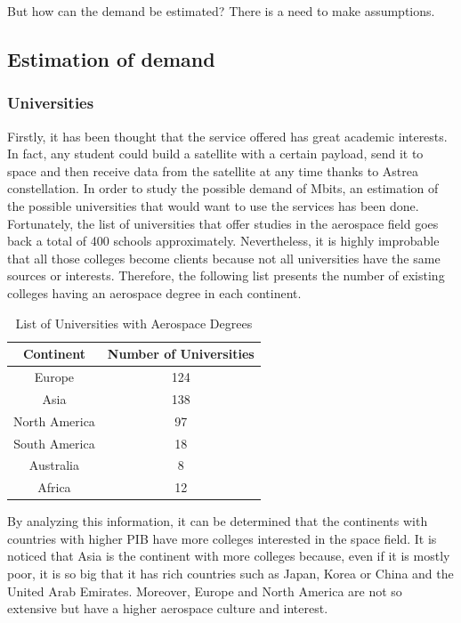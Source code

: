 But how can the demand be estimated? There is a need to make assumptions. 

\subsection{Estimation of demand}

\subsubsection{Universities}

Firstly, it has been thought that the service offered has great academic interests. In fact, any student could build a satellite with a certain payload, send it to space and then receive data from the satellite at any time thanks to Astrea constellation. 
\newline
\newline
In order to study the possible demand of Mbits, an estimation of the possible universities that would want to use the services has been done. Fortunately, the list of universities that offer studies in the aerospace field goes back a total of 400 schools approximately. Nevertheless, it is highly improbable that all those colleges become clients because not all universities have the same sources or interests. Therefore, the following list presents the number of existing colleges having an aerospace degree in each continent.

	\begin{table}[!h]
	\begin{center}
	\begin{tabular}{|c|c|}
	\bf{Continent} & \bf{Number of Universities}\\
	\hline 
	Europe & 124\\
	\hline 
	Asia & 138\\
	\hline 
	North America &  97\\
	\hline
	 South America & 18\\
	\hline 
	Australia & 8\\
	\hline 
	Africa & 12\\
	\end{tabular}
	\end{center}
	\caption{List of Universities with Aerospace Degrees}
	\end{table} 	

By analyzing this information, it can be determined that the continents with countries with higher PIB have more colleges interested in the space field. It is noticed that Asia is the continent with more colleges because, even if it is mostly poor, it is so big that it has rich countries such as Japan, Korea or China and the United Arab Emirates. Moreover, Europe and North America are not so extensive but have a higher aerospace culture and interest. 

